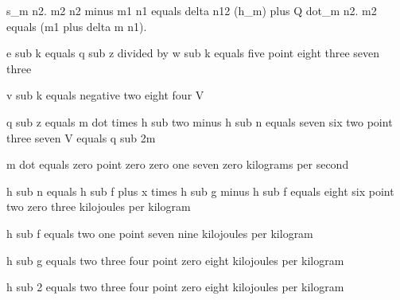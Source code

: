 s_m n2. m2 n2 minus m1 n1 equals delta n12 (h_m) plus Q dot_m n2. m2 equals (m1 plus delta m n1).

e sub k equals q sub z divided by w sub k equals five point eight three seven three  

v sub k equals negative two eight four V  

q sub z equals m dot times h sub two minus h sub n equals seven six two point three seven V equals q sub 2m  

m dot equals zero point zero zero one seven zero kilograms per second  

h sub n equals h sub f plus x times h sub g minus h sub f equals eight six point two zero three kilojoules per kilogram  

h sub f equals two one point seven nine kilojoules per kilogram  

h sub g equals two three four point zero eight kilojoules per kilogram  

h sub 2 equals two three four point zero eight kilojoules per kilogram